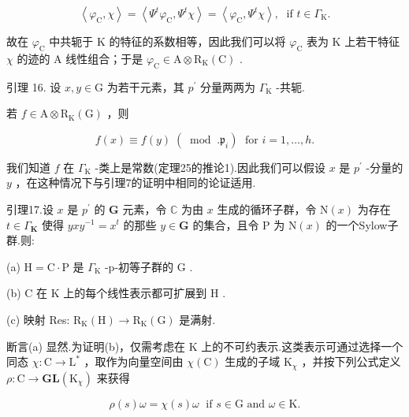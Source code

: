 \documentclass[10pt]{article}
\begin{document}
\[
\left\langle  {{\varphi }_{\mathrm{C}},\chi }\right\rangle   = \left\langle  {{\Psi }^{t}{\varphi }_{\mathrm{C}},{\Psi }^{t}\chi }\right\rangle   = \left\langle  {{\varphi }_{\mathrm{C}},{\Psi }^{t}\chi }\right\rangle  ,\;\text{ if }t \in  {\Gamma }_{\mathrm{K}}.
\]

故在 \({\varphi }_{\mathrm{C}}\) 中共轭于 \(\mathrm{K}\) 的特征的系数相等，因此我们可以将 \({\varphi }_{\mathrm{C}}\) 表为 \(\mathrm{K}\) 上若干特征 \(\chi\) 的迹的 A 线性组合；于是 \({\varphi }_{\mathrm{C}} \in  \mathrm{A} \otimes  {\mathrm{R}}_{\mathrm{K}}\left( \mathrm{C}\right)\) .

引理 16. 设 \(x,y \in  \mathrm{G}\) 为若干元素，其 \({p}^{\prime }\) 分量两两为 \({\Gamma }_{\mathrm{K}}\) -共轭.

若 \(f \in  \mathrm{A} \otimes  {\mathrm{R}}_{\mathrm{K}}\left( \mathrm{G}\right)\) ，则

\[
f\left( x\right)  \equiv  f\left( y\right) \;\left( {\;\operatorname{mod}\;.{\mathfrak{p}}_{i}}\right) \;\text{ for }i = 1,\ldots ,h.
\]

我们知道 \(f\) 在 \({\Gamma }_{\mathrm{K}}\) -类上是常数(定理25的推论1).因此我们可以假设 \(x\) 是 \({p}^{\prime }\) -分量的 \(y\) ，在这种情况下与引理7的证明中相同的论证适用.

引理17.设 \(x\) 是 \({p}^{\prime }\) 的 \(\mathbf{G}\) 元素，令 \(\mathbb{C}\) 为由 \(x\) 生成的循环子群，令 \(\mathrm{N}\left( x\right)\) 为存在 \(t \in  {\Gamma }_{\mathbf{K}}\) 使得 \({yx}{y}^{-1} = {x}^{t}\) 的那些 \(y \in  \mathbf{G}\) 的集合，且令 \(\mathrm{P}\) 为 \(\mathrm{N}\left( x\right)\) 的一个Sylow子群.则:

(a) \(\mathrm{H} = \mathrm{C} \cdot  \mathrm{P}\) 是 \({\Gamma }_{\mathrm{K}}\) -p-初等子群的 \(\mathrm{G}\) .

(b) \(\mathrm{C}\) 在 \(\mathrm{K}\) 上的每个线性表示都可扩展到 \(\mathrm{H}\) .

(c) 映射 Res: \({\mathrm{R}}_{\mathrm{K}}\left( \mathrm{H}\right)  \rightarrow  {\mathrm{R}}_{\mathrm{K}}\left( \mathrm{G}\right)\) 是满射.

断言(a) 显然.为证明(b)，仅需考虑在 K 上的不可约表示.这类表示可通过选择一个同态 \(\chi  : \mathrm{C} \rightarrow  {\mathrm{L}}^{ * }\) ，取作为向量空间由 \(\chi \left( \mathrm{C}\right)\) 生成的子域 \({\mathrm{K}}_{\chi }\) ，并按下列公式定义 \(\rho  : \mathrm{C} \rightarrow  \mathbf{{GL}}\left( {\mathrm{K}}_{\chi }\right)\) 来获得

\[
\rho \left( s\right) \omega  = \chi \left( s\right) \omega \;\text{ if }s \in  \mathrm{G}\text{ and }\omega  \in  \mathrm{K}.
\]
\end{document}
